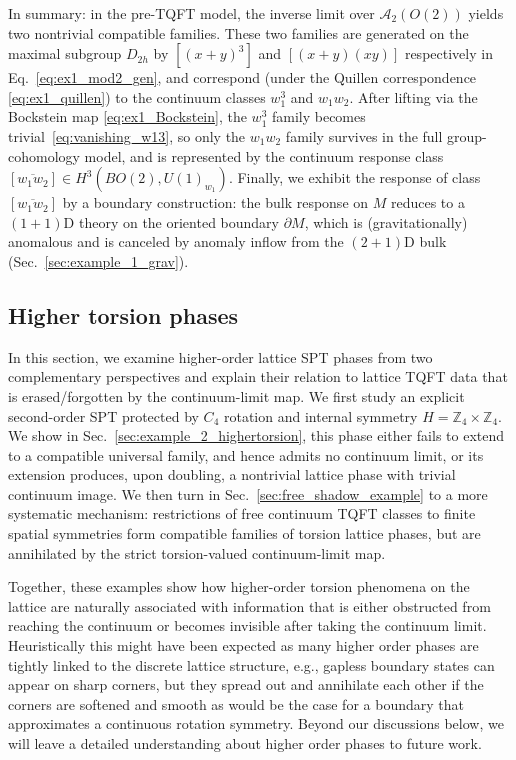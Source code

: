 \documentclass[aps,prx,reprint,superscriptaddress,twocolumn,amsmath,amssymb,amsfonts, nofootinbib]{revtex4-2}
\newcommand{\qa}{\mathcal{A}_{2}}
\theoremstyle{apsstyle}
\begin{document}
In summary: in the pre-TQFT model, the inverse limit over $\qa(O(2))$ yields two nontrivial compatible families. These two families are generated on the maximal subgroup $D_{2h}$ by $[(x{+}y)^3]$ and $[(x{+}y)(xy)]$ respectively in Eq.~\ref{eq:ex1_mod2_gen}, and correspond (under the Quillen correspondence \eqref{eq:ex1_quillen}) to the continuum classes $w_1^3$ and $w_1w_2$. After lifting via the Bockstein map \eqref{eq:ex1_Bockstein}, the $w_1^3$ family becomes trivial~\eqref{eq:vanishing_w13}, so only the $w_1w_2$ family survives in the full group-cohomology model, and is represented by the continuum response class $[\overline{w_1w_2}]\in H^3(BO(2),U(1)_{w_1})$. Finally, we exhibit the response of class $[\overline{w_1w_2}]$ by a boundary construction: the bulk response on $M$ reduces to a $(1{+}1)$D theory on the oriented boundary $\partial M$, which is (gravitationally) anomalous and is canceled by anomaly inflow from the $(2{+}1)$D bulk (Sec.~\ref{sec:example_1_grav}).


\subsection{Higher torsion phases}
\label{sec:example_2}

In this section, we examine higher-order lattice SPT phases from two complementary perspectives and explain their relation to lattice TQFT data that is erased/forgotten by the continuum-limit map. We first study an explicit second-order SPT protected by $C_4$ rotation and internal symmetry $H=\mathbb Z_4\times\mathbb Z_4$. We show in Sec.~\ref{sec:example_2_highertorsion}, this phase either fails to extend to a compatible universal family, and hence admits no continuum limit, or its extension produces, upon doubling, a nontrivial lattice phase with trivial continuum image. We then turn in Sec.~\ref{sec:free_shadow_example} to a more systematic mechanism: restrictions of free continuum TQFT classes to finite spatial symmetries form compatible families of torsion lattice phases, but are annihilated by the strict torsion-valued continuum-limit map. 

Together, these examples show how higher-order torsion phenomena on the lattice are naturally associated with information that is either obstructed from reaching the continuum or becomes invisible after taking the continuum limit. Heuristically this might have been expected as many higher order phases are tightly linked to the discrete lattice structure, e.g., gapless boundary states can appear on sharp corners, but they spread out and annihilate each other if the corners are softened and smooth as would be the case for a boundary that approximates a continuous rotation symmetry. Beyond our discussions below, we will leave a detailed understanding about higher order phases to future work.
\end{document}
